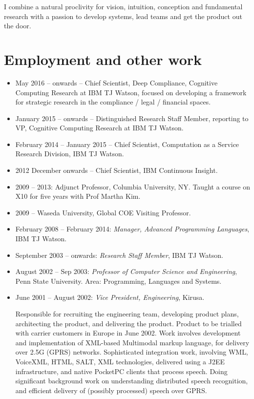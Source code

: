 \documentclass{article}
\begin{document}
I combine a natural proclivity for vision, intuition, conception and
fundamental research with a passion to develop systems, lead teams and
get the product out the door.  

\section*{Employment and other work}

\begin{itemize}
\item  May 2016 -- onwards -- Chief Scientist, Deep Compliance,
  Cognitive Computing Research at IBM TJ Watson, focused on developing
  a framework for strategic research in the compliance / legal /
  financial spaces. 

\item  January 2015 -- onwards -- Distinguished Research Staff Member,
  reporting to VP, Cognitive Computing Research at IBM TJ Watson.

\item  February 2014 -- January 2015 -- Chief Scientist, Computation
  as a Service Research Division, IBM TJ Watson.

\item 2012 December onwards -- Chief Scientist, IBM Continuous Insight.

\item 2009 -- 2013: Adjunct Professor, Columbia University, NY. Taught
  a course on X10 for five years with Prof Martha Kim.

\item 2009 -- Waseda University, Global COE Visiting Professor.

\item February 2008 -- February 2014: \textit{Manager, Advanced
  Programming Languages}, IBM TJ Watson. 

\item September 2003 -- onwards: \textit{Research Staff Member}, IBM
  TJ Watson. 

\item August 2002 -- Sep 2003: \textit{Professor of Computer Science and
Engineering}, Penn State University. Area: Programming, Languages and Systems.

\item June 2001 -- August 2002: \textit{Vice President, Engineering}, Kirusa.

  Responsible for recruiting the engineering team, developing product
  plans, architecting the product, and delivering the product.
  Product to be trialled with carrier customers in Europe in June
  2002. Work involves development and implementation of XML-based
  Multimodal markup language, for delivery over 2.5G (GPRS)
  networks. Sophisticated integration work, involving WML, VoiceXML,
  HTML, SALT, XML technologies, delivered using a J2EE infrastructure,
  and native PocketPC clients that process speech. Doing significant
  background work on understanding distributed speech recognition, and
  efficient delivery of (possibly processed) speech over GPRS.


\end{itemize}
\end{document}
